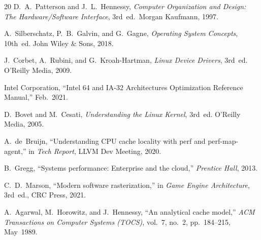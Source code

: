 \documentclass[conference]{IEEEtran}
\begin{document}
\begin{thebibliography}{20}
D.~A.~Patterson and J.~L.~Hennessy,
\emph{Computer Organization and Design: The Hardware/Software Interface},
3rd~ed.~Morgan Kaufmann, 1997.

A.~Silberschatz, P.~B.~Galvin, and G.~Gagne,
\emph{Operating System Concepts}, 10th~ed.
John Wiley \& Sons, 2018.

J.~Corbet, A.~Rubini, and G.~Kroah-Hartman,
\emph{Linux Device Drivers}, 3rd~ed.
O'Reilly Media, 2009.

Intel Corporation,
``Intel 64 and IA-32 Architectures Optimization Reference Manual,''
Feb.~2021.

D.~Bovet and M.~Cesati,
\emph{Understanding the Linux Kernel}, 3rd~ed.
O'Reilly Media, 2005.

A.~de~Bruijn,
``Understanding CPU cache locality with perf and perf-map-agent,''
in \emph{Tech Report}, LLVM Dev Meeting, 2020.

B.~Gregg,
``Systems performance: Enterprise and the cloud,''
\emph{Prentice Hall}, 2013.

C.~D.~Marson,
``Modern software rasterization,''
in \emph{Game Engine Architecture}, 3rd~ed., CRC Press, 2021.

A.~Agarwal, M.~Horowitz, and J.~Hennessy,
``An analytical cache model,''
\emph{ACM Transactions on Computer Systems (TOCS)}, vol.~7, no.~2,
pp.~184--215, May~1989.

\end{thebibliography}
\end{document}
